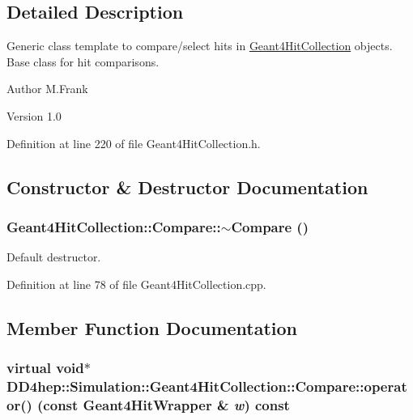 \subsection{Detailed Description}
Generic class template to compare/select hits in \hyperlink{class_d_d4hep_1_1_simulation_1_1_geant4_hit_collection}{Geant4HitCollection} objects. Base class for hit comparisons.

\begin{DoxyAuthor}{Author}
M.Frank 
\end{DoxyAuthor}
\begin{DoxyVersion}{Version}
1.0 
\end{DoxyVersion}


Definition at line 220 of file Geant4HitCollection.h.

\subsection{Constructor \& Destructor Documentation}
\hypertarget{class_d_d4hep_1_1_simulation_1_1_geant4_hit_collection_1_1_compare_a564c52106afdec9d7721a4089ada4fb9}{
\subsubsection[{$\sim$Compare}]{\setlength{\rightskip}{0pt plus 5cm}Geant4HitCollection::Compare::$\sim$Compare ()}}
\label{class_d_d4hep_1_1_simulation_1_1_geant4_hit_collection_1_1_compare_a564c52106afdec9d7721a4089ada4fb9}


Default destructor. 

Definition at line 78 of file Geant4HitCollection.cpp.

\subsection{Member Function Documentation}
\hypertarget{class_d_d4hep_1_1_simulation_1_1_geant4_hit_collection_1_1_compare_ad81521e6dfc48aaee6d2dd9464a7afeb}{
\subsubsection[{operator()}]{\setlength{\rightskip}{0pt plus 5cm}virtual void$\ast$ DD4hep::Simulation::Geant4HitCollection::Compare::operator() (const {\bf Geant4HitWrapper} \& {\em w}) const}}
\label{class_d_d4hep_1_1_simulation_1_1_geant4_hit_collection_1_1_compare_ad81521e6dfc48aaee6d2dd9464a7afeb}


